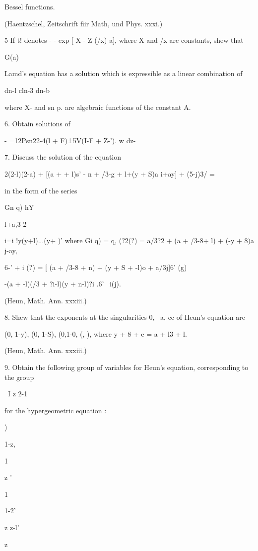 {{{{{{{{Bessel functions.

(Haentzschel, Zeitschrift fiir Math, und Phys. xxxi.)

5 If t! denotes - - exp [ X - Z (/x) a], where X and /x are constants,
shew that

G(a)

Lamd's equation has a solution which is expressible as a linear
combination of

dn-l cln-3 dn-b

where X- and sn p. are algebraic functions of the constant A.


6. Obtain solutions of

- =12Psn22-4(l + F)±5V(I-F + Z-'). w dz-


7. Discuss the solution of the equation

2(2-l)(2-a) + [(a + + l)s' - n + /3-g + l+(y + S)a i+ay] + (5-j)3/ =

in the form of the series

Gn q) hY

l+a,3 2

i=i !y(y+l)...(y+ )' where Gi q) = q, (?2(?) = a/3?2 + (a + /3-8+ l) +
(-y + 8)a j-ay,

6-' + i (?) = [ (a + /3-8 + n) + (y + S + -l)o + a/3j]6' (g)

-(a + -l)(/3 + ?i-l)(y + n-l)?i .6' \ i(j).

(Heun, Math. Ann. xxxiii.)

%
%

8. Shew that the exponents at the singularities 0, \, a, cc of Heun's
equation are

(0, 1-y), (0, 1-S), (0,1-0, (, ), where y + 8 + e = a + l3 + l.

(Heun, Math. Ann. xxxiii.)

9. Obtain the following group of variables for Heun's equation,
corresponding to the group

\ I z 2-1

for the hypergeometric equation :

 )

1-z,

1

z '

1

1-2'

z z-l'

z

}}}}}}}}
